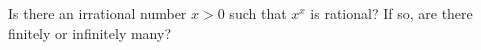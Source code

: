 Is there an irrational number $x>0$ such that $x^x$ is rational? If so, are there finitely or infinitely many?
